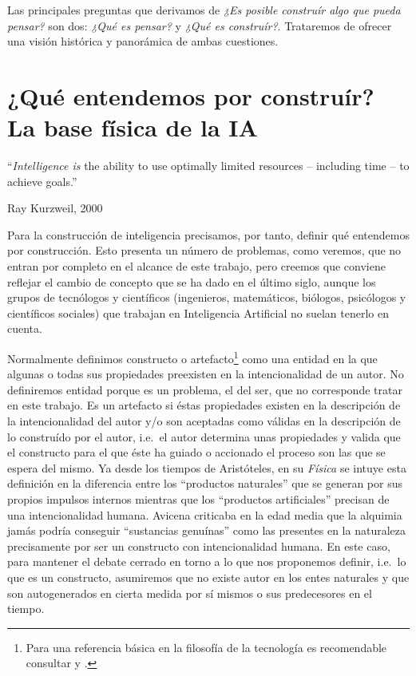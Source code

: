 \documentclass[12pt]{memoir}
\begin{document}
Las principales preguntas que derivamos de \textit{¿Es posible construír algo que pueda pensar?} son dos: \textit{¿Qué es pensar?} y \textit{¿Qué es construír?}. Trataremos de ofrecer una visión histórica y panorámica de ambas cuestiones.

\chapter{¿Qué entendemos por construír?\\La base física de la IA}
\epigraph{``\textit{Intelligence is} the ability to use optimally limited resources – including time – to achieve goals.''}{Ray Kurzweil, 2000}
 

Para la construcción de inteligencia precisamos, por tanto, definir qué entendemos por construcción. Esto presenta un número de problemas, como veremos, que no entran por completo en el alcance de este trabajo, pero creemos que conviene reflejar el cambio de concepto que se ha dado en el último siglo, aunque los grupos de tecnólogos y científicos (ingenieros, matemáticos, biólogos, psicólogos y científicos sociales) que trabajan en Inteligencia Artificial no suelan tenerlo en cuenta. 

Normalmente definimos constructo o artefacto\footnote{Para una referencia básica en la filosofía de la tecnología es recomendable consultar \cite{sep-technology} y \cite{sep-artifact}.} como una entidad en la que algunas o todas sus propiedades preexisten en la intencionalidad de un autor. No definiremos entidad porque es un problema, el del ser, que no corresponde tratar en este trabajo. Es un artefacto si éstas propiedades existen en la descripción de la intencionalidad del autor y/o son aceptadas como válidas en la descripción de lo construído por el autor, i.e.\ el autor determina unas propiedades y valida que el constructo para el que éste ha guiado o accionado el proceso son las que se espera del mismo. Ya desde los tiempos de Aristóteles, en su \textit{Física} se intuye esta definición en la diferencia entre los ``productos naturales'' que se generan por sus propios impulsos internos mientras que los ``productos artificiales'' precisan de una intencionalidad humana. Avicena criticaba en la edad media que la alquimia jamás podría conseguir ``sustancias genuínas'' como las presentes en la naturaleza precisamente por ser un constructo con intencionalidad humana. En este caso, para mantener el debate cerrado en torno a lo que nos proponemos definir, i.e.\ lo que es un constructo, asumiremos que no existe autor en los entes naturales y que son autogenerados en cierta medida por sí mismos o sus predecesores en el tiempo.
\end{document}
